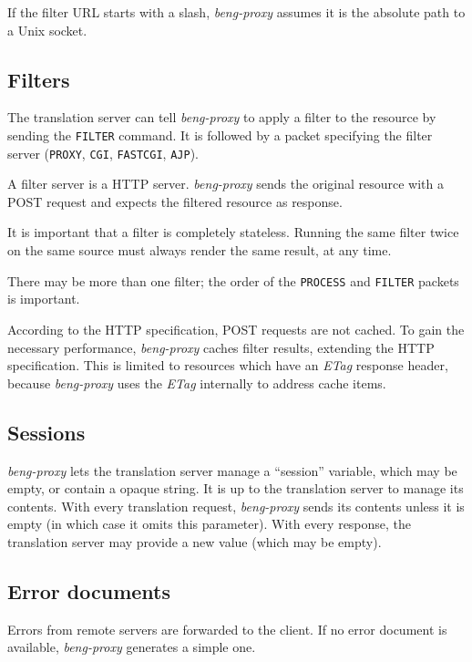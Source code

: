 \documentclass[a4paper,12pt]{article}
\begin{document}
If the filter URL starts with a slash, \emph{beng-proxy} assumes it is
the absolute path to a Unix socket.

\subsection{Filters}
\label{filter}

The translation server can tell \emph{beng-proxy} to apply a filter to
the resource by sending the \verb|FILTER| command.  It is followed
by a packet specifying the filter server (\verb|PROXY|,
\verb|CGI|, \verb|FASTCGI|, \verb|AJP|).

A filter server is a HTTP server.  \emph{beng-proxy} sends the
original resource with a POST request and expects the filtered
resource as response.

It is important that a filter is completely stateless.  Running the
same filter twice on the same source must always render the same
result, at any time.

There may be more than one filter; the order of the \verb|PROCESS|
and \verb|FILTER| packets is important.

According to the HTTP specification, POST requests are not cached.  To
gain the necessary performance, \emph{beng-proxy} caches filter
results, extending the HTTP specification.  This is limited to
resources which have an \emph{ETag} response header, because
\emph{beng-proxy} uses the \emph{ETag} internally to address cache
items.

\subsection{Sessions}
\label{sessions}

\emph{beng-proxy} lets the translation server manage a ``session''
variable, which may be empty, or contain a opaque string.  It is up to
the translation server to manage its contents.  With every translation
request, \emph{beng-proxy} sends its contents unless it is empty (in
which case it omits this parameter).  With every response, the
translation server may provide a new value (which may be empty).

\subsection{Error documents}
\label{errdoc}

Errors from remote servers are forwarded to the client.  If no error
document is available, \emph{beng-proxy} generates a simple one.
\end{document}
